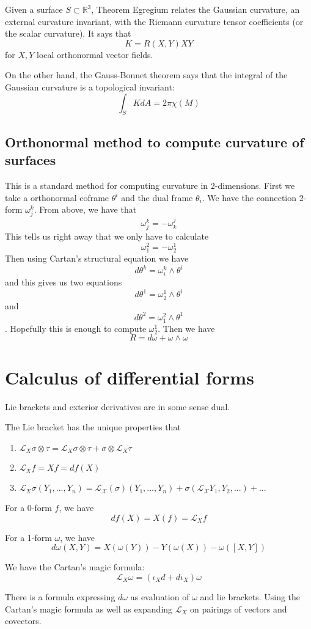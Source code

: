 \documentclass[main.tex]{subfiles}
\begin{document}
Given a surface $S \subset \mathbb{R}^3$, Theorem Egregium relates the Gaussian curvature, an external curvature invariant, with the Riemann curvature tensor coefficients (or the scalar curvature). It says that 
$$
K = R(X, Y) X Y
$$
for $X, Y$ local orthonormal vector fields. 

On the other hand, the Gauss-Bonnet theorem says that the integral of the Gaussian curvature is a topological invariant:
$$
\int_S K dA = 2 \pi \chi(M)
$$

\subsection{Orthonormal method to compute curvature of surfaces}
This is a standard method for computing curvature in 2-dimensions. First we take a orthonormal coframe $\theta^i$ and the dual frame $\theta_i$. We have the connection 2-form $\omega_j ^k$. From above, we have that 
$$
\omega_j ^k = - \omega_k ^j
$$
This tells us right away that we only have to calculate 
$$
\omega_1 ^2 = - \omega_2 ^1
$$
Then using Cartan's structural equation we have $$
d\theta^k = \omega^k _i \wedge \theta^i
$$
and this gives us two equations
$$
d\theta^1 = \omega^1 _2 \wedge \theta^i
$$ and 
$$
d\theta^2 = \omega^2 _1 \wedge \theta^1
$$. 
Hopefully this is enough to compute $\omega^1_2$. Then we have 
$$
R = d \omega + \omega \wedge \omega
$$


\section{Calculus of differential forms}
Lie brackets and exterior derivatives are in some sense dual.

The Lie bracket has the unique properties  that 
\begin{enumerate}
    \item $\mathcal{L}_X \sigma \otimes \tau = \mathcal{L}_X \sigma \otimes \tau + \sigma \otimes \mathcal{L}_X \tau$
    \item $\mathcal{L}_X f = X f = df (X)$
    \item $\mathcal{L}_X \sigma(Y_1, ..., Y_n) = \mathcal{L_X} (\sigma)(Y_1, ..., Y_n) + \sigma (\mathcal{L_X}Y_1, Y_2,...) + ...$
\end{enumerate}

For a 0-form $f$, we have 
$$
df(X) = X(f) = \mathcal{L}_X f
$$

For a 1-form $\omega$, we have 
$$
d\omega(X,Y) = X(\omega(Y)) - Y(\omega(X)) - \omega([X,Y])
$$

We have the Cartan's magic formula:
$$
\mathcal{L}_X \omega = (\iota_X d + d \iota_X) \omega
$$

There is a formula expressing $d\omega$ as evaluation of $\omega$ and lie brackets.
Using the Cartan's magic formula as well as expanding $\mathcal{L}_X$ on pairings of vectors and covectors.
\end{document}
